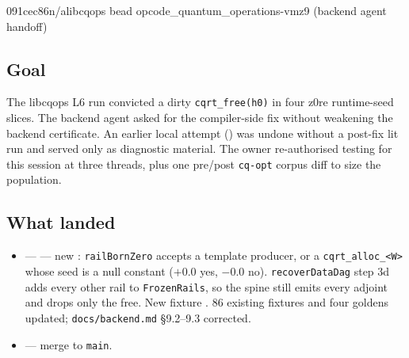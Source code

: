 %
  {091cec86}{n/a}{libcqops bead opcode\_quantum\_operations-vmz9 (backend agent handoff)}

\subsection*{Goal}
The libcqops L6 run convicted a dirty \texttt{cqrt\_free(h0)} in four z0re
runtime-seed slices. The backend agent asked for the compiler-side fix without
weakening the backend certificate. An earlier local attempt () was undone without a
post-fix lit run and served only as diagnostic material. The owner re-authorised testing
for this session at three threads, plus one pre/post \texttt{cq-opt} corpus
diff to size the population.

\subsection*{What landed}
\begin{itemize}
  \item {} ---  --- new
  : \texttt{railBornZero} accepts a template
  producer, or a \texttt{cqrt\_alloc\_<W>} whose seed is a null constant
  ($+0.0$ yes, $-0.0$ no). \texttt{recoverDataDag} step 3d adds every other
  rail to \texttt{FrozenRails}, so the spine still emits every adjoint and
  drops only the free. New fixture
  . 86 existing fixtures and
  four goldens updated; \texttt{docs/backend.md} \S9.2--9.3 corrected.
  \item {} --- merge to \texttt{main}.
\end{itemize}

